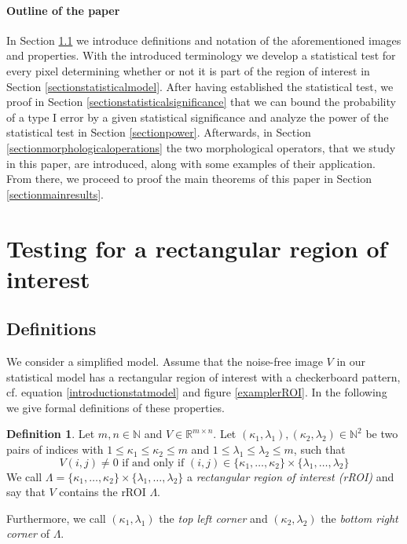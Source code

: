 \documentclass[a4paper,12pt]{article}
\theoremstyle{plain}
\theoremstyle{definition}
\newtheorem{definition}[theorem]{Definition}
\begin{document}
\paragraph{Outline of the paper}

In Section \ref{sectiondefinitions} we introduce definitions and notation of the aforementioned images and properties. With the introduced terminology we develop a statistical test for every pixel determining whether or not it is part of the region of interest in Section \ref{sectionstatisticalmodel}. After having established the statistical test, we proof in Section \ref{sectionstatisticalsignificance} that we can bound the probability of a type I error by a given statistical significance and analyze the power of the statistical test in Section \ref{sectionpower}. Afterwards, in Section \ref{sectionmorphologicaloperations} the two morphological operators, that we study in this paper, are introduced, along with some examples of their application. From there, we proceed to proof the main theorems of this paper in Section \ref{sectionmainresults}.

\newpage

\section{Testing for a rectangular region of interest}

\subsection{Definitions}\label{sectiondefinitions}

We consider a simplified model. Assume that the noise-free image $V$ in our statistical model has a rectangular region of interest with a checkerboard pattern, cf. equation \eqref{introductionstatmodel} and figure \ref{examplerROI}. In the following we give formal definitions of these properties.

\begin{definition}
	Let $m, n \in \mathbb{N}$ and $V \in \mathbb{R}^{m \times n}$. Let $(\kappa_1, \lambda_1), (\kappa_2, \lambda_2) \in \mathbb{N}^2$ be two pairs of indices with $1 \leq \kappa_1 \leq \kappa_2 \leq m$ and $1 \leq \lambda_1 \leq \lambda_2 \leq m$, such that
	\begin{equation}\label{eqrROI}
		V(i, j) \neq 0 \textrm{ if and only if } (i, j) \in \{ \kappa_1, \dots, \kappa_2 \} \times \{ \lambda_1, \dots, \lambda_2 \}
	\end{equation}
	We call $\varLambda = \{ \kappa_1, \dots, \kappa_2 \} \times \{ \lambda_1, \dots, \lambda_2 \}$ a \emph{rectangular region of interest (rROI)} and say that $V$ contains the rROI $\varLambda$.
	
	Furthermore, we call $(\kappa_1, \lambda_1)$ the \emph{top left corner} and $(\kappa_2, \lambda_2)$ the \emph{bottom right corner} of $\varLambda$.
\end{definition}
\end{document}
